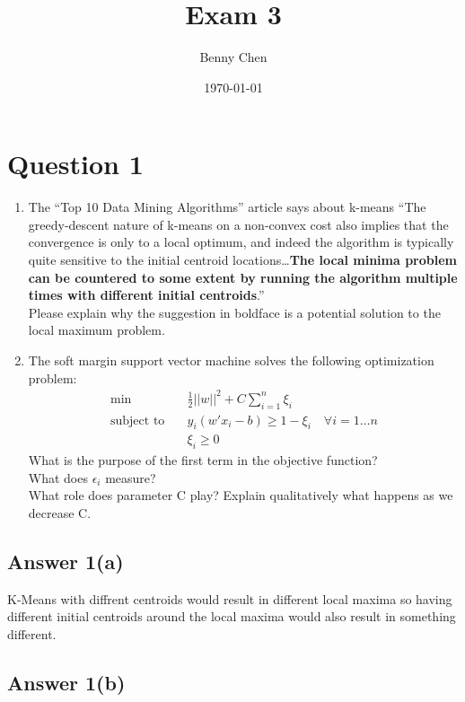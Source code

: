 \documentclass{article}
\title{Exam 3}
\author{Benny Chen}
\date{\today}
\begin{document}
\maketitle

\section{Question 1}

\begin{enumerate}[label= (\alph*)]
    \item The ``Top 10 Data Mining Algorithms'' article says about k-means ``The greedy-descent nature of k-means on a non-convex cost also implies that the convergence is only to a local optimum, and indeed the algorithm is typically quite sensitive to the initial centroid locations\ldots \textbf{The local minima problem can be countered to some extent by running the algorithm multiple times with different initial centroids}.''
    \\
    Please explain why the suggestion in boldface is a potential solution to the local maximum problem.
    \item The soft margin support vector machine solves the following optimization problem:
    \begin{align*}
        \min \quad & \frac{1}{2} ||w||^2 + C \sum_{i=1}^{n} \xi_i \\
        \text{subject to} \quad & y_i(w' x_i - b) \geq 1 - \xi_i \quad \forall i = 1 \ldots n \\
        & \xi_i \geq 0
    \end{align*}
    What is the purpose of the first term in the objective function?
    \\
    What does $\epsilon_i$ measure?
    \\
    What role does parameter C play? Explain qualitatively what happens as we decrease C.
\end{enumerate}

\subsection{Answer 1(a)}

K-Means with diffrent centroids would result in different local maxima so having different initial centroids around the local maxima would also result in something different.

\subsection{Answer 1(b)}
\end{document}

